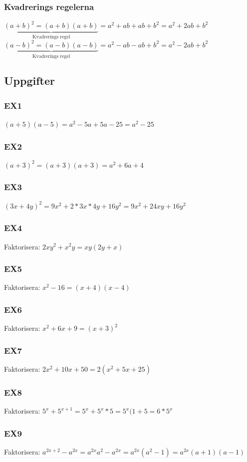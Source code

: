 \documentclass[a4paper,10pt]{article}
\begin{document}
\begin{flushleft}
    \subsubsection{Kvadrerings regelerna}
      $ \underbrace{(a+b)^2 = (a+b)(a+b) }_{\text{Kvadrerings regel}} = a^2+ab+ab+b^2 = a^2+2ab+b^2 $\newline
      $ \underbrace{(a-b)^2 = (a-b)(a-b)}_{\text{Kvadrerings regel}} = a^2-ab-ab+b^2 = a^2-2ab+b^2 $\newline
  \subsection{Uppgifter}
    \subsubsection{EX1}
      $ (a+5)(a-5) = a^2-5a+5a-25=a^2-25 $
    \subsubsection{EX2}
      $ (a+3)^2 = (a+3)(a+3) = a^2+6a+4 $
    \subsubsection{EX3}
      $ (3x+4y)^2 = 9x^2+2*3x*4y+16y^2 = 9x^2+24xy+16y^2 $
    \subsubsection{EX4}
      Faktorisera: $ 2xy^2+x^2y = xy(2y+x) $
    \subsubsection{EX5}
      Faktorisera: $ x^2-16 = (x+4)(x-4) $
    \subsubsection{EX6}
      Faktorisera: $ x^2+6x+9 = (x+3)^2 $
    \subsubsection{EX7}
      Faktorisera: $ 2x^2+10x+50 = 2(x^2+5x+25) $
    \subsubsection{EX8}
      Faktorisera: $ 5^x+5^{x+1} = 5^x+5^x*5 = 5^x(1+5 = 6*5^x $
    \subsubsection{EX9}
      Faktorisera: $ a^{2x+2}-a^{2x} = a^{2x}a^2-a^{2x} = a^{2x}(a^2-1) = a^{2x}(a+1)(a-1) $


\end{flushleft}
\end{document}

